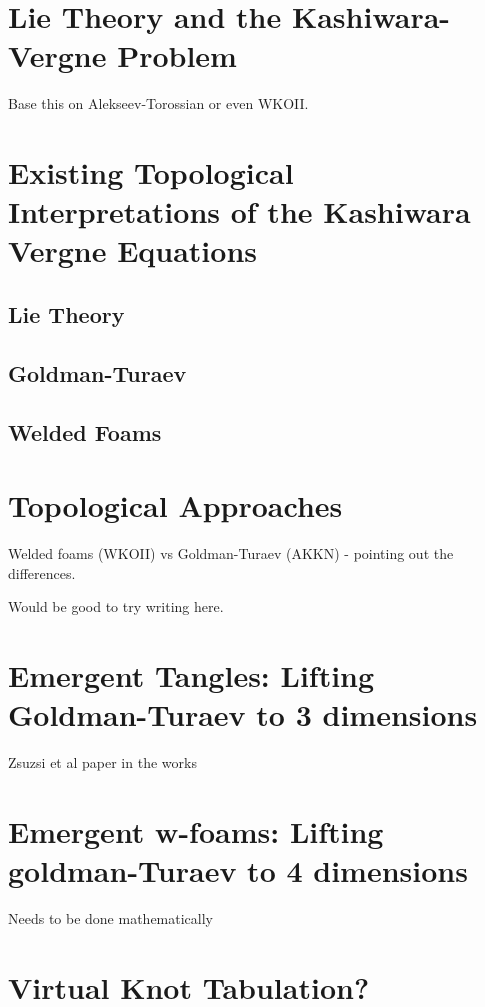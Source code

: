 \documentclass[12pt]{report}
\theoremstyle{regular}
\begin{document}
        \chapter{Lie Theory and the Kashiwara-Vergne Problem}

        Base this on Alekseev-Torossian or even WKOII.

        \chapter{Existing Topological Interpretations of the Kashiwara Vergne Equations}

        \section{Lie Theory}

        \section{Goldman-Turaev}

        \section{Welded Foams}

        \chapter{Topological Approaches}
        Welded foams (WKOII) vs Goldman-Turaev (AKKN) - pointing out the differences.

        Would be good to try writing here.

        \chapter{Emergent Tangles: Lifting Goldman-Turaev to 3 dimensions}
        Zsuzsi et al paper in the works

        \chapter{Emergent w-foams: Lifting goldman-Turaev to 4 dimensions}
        Needs to be done mathematically

        \chapter{Virtual Knot Tabulation?}
\end{document}
